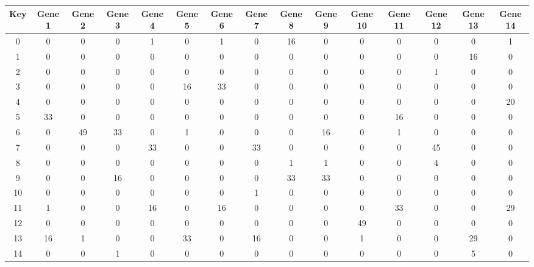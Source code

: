 \begin{tabular}{|c|c|c|c|c|c|c|c|c|c|c|c|c|c|c|}
\hline
Key & Gene 1 & Gene 2 & Gene 3 & Gene 4 & Gene 5 & Gene 6 & Gene 7 & Gene 8 & Gene 9 & Gene 10 & Gene 11 & Gene 12 & Gene 13 & Gene 14 \\
\hline
0 & 0 & 0 & 0 & 1 & 0 & 1 & 0 & 16 & 0 & 0 & 0 & 0 & 0 & 1 \\
1 & 0 & 0 & 0 & 0 & 0 & 0 & 0 & 0 & 0 & 0 & 0 & 0 & 16 & 0 \\
2 & 0 & 0 & 0 & 0 & 0 & 0 & 0 & 0 & 0 & 0 & 0 & 1 & 0 & 0 \\
3 & 0 & 0 & 0 & 0 & 16 & 33 & 0 & 0 & 0 & 0 & 0 & 0 & 0 & 0 \\
4 & 0 & 0 & 0 & 0 & 0 & 0 & 0 & 0 & 0 & 0 & 0 & 0 & 0 & 20 \\
5 & 33 & 0 & 0 & 0 & 0 & 0 & 0 & 0 & 0 & 0 & 16 & 0 & 0 & 0 \\
6 & 0 & 49 & 33 & 0 & 1 & 0 & 0 & 0 & 16 & 0 & 1 & 0 & 0 & 0 \\
7 & 0 & 0 & 0 & 33 & 0 & 0 & 33 & 0 & 0 & 0 & 0 & 45 & 0 & 0 \\
8 & 0 & 0 & 0 & 0 & 0 & 0 & 0 & 1 & 1 & 0 & 0 & 4 & 0 & 0 \\
9 & 0 & 0 & 16 & 0 & 0 & 0 & 0 & 33 & 33 & 0 & 0 & 0 & 0 & 0 \\
10 & 0 & 0 & 0 & 0 & 0 & 0 & 1 & 0 & 0 & 0 & 0 & 0 & 0 & 0 \\
11 & 1 & 0 & 0 & 16 & 0 & 16 & 0 & 0 & 0 & 0 & 33 & 0 & 0 & 29 \\
12 & 0 & 0 & 0 & 0 & 0 & 0 & 0 & 0 & 0 & 49 & 0 & 0 & 0 & 0 \\
13 & 16 & 1 & 0 & 0 & 33 & 0 & 16 & 0 & 0 & 1 & 0 & 0 & 29 & 0 \\
14 & 0 & 0 & 1 & 0 & 0 & 0 & 0 & 0 & 0 & 0 & 0 & 0 & 5 & 0 \\
\hline
\end{tabular}